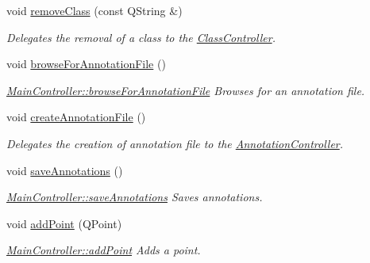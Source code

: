 \begin{DoxyCompactItemize}
void \hyperlink{classMainController_ad639a2fd588d6fe011701a5168184883}{remove\+Class} (const Q\+String \&)
\begin{DoxyCompactList}\small\item\em Delegates the removal of a class to the \hyperlink{classClassController}{Class\+Controller}. \end{DoxyCompactList}\item 
\mbox{\label{classMainController_a018730fa763bed9ef77bb7c2fc994bb8}} 
void \hyperlink{classMainController_a018730fa763bed9ef77bb7c2fc994bb8}{browse\+For\+Annotation\+File} ()
\begin{DoxyCompactList}\small\item\em \hyperlink{classMainController_a018730fa763bed9ef77bb7c2fc994bb8}{Main\+Controller\+::browse\+For\+Annotation\+File} Browses for an annotation file. \end{DoxyCompactList}\item 
\mbox{\label{classMainController_adcab0ecd57994728c1ad67dafc844179}} 
void \hyperlink{classMainController_adcab0ecd57994728c1ad67dafc844179}{create\+Annotation\+File} ()
\begin{DoxyCompactList}\small\item\em Delegates the creation of annotation file to the \hyperlink{classAnnotationController}{Annotation\+Controller}. \end{DoxyCompactList}\item 
\mbox{\label{classMainController_a6051544c31fbdeb375a88715b8406b52}} 
void \hyperlink{classMainController_a6051544c31fbdeb375a88715b8406b52}{save\+Annotations} ()
\begin{DoxyCompactList}\small\item\em \hyperlink{classMainController_a6051544c31fbdeb375a88715b8406b52}{Main\+Controller\+::save\+Annotations} Saves annotations. \end{DoxyCompactList}\item 
void \hyperlink{classMainController_a215cb23587a572993fb00b0c09a393e2}{add\+Point} (Q\+Point)
\begin{DoxyCompactList}\small\item\em \hyperlink{classMainController_a215cb23587a572993fb00b0c09a393e2}{Main\+Controller\+::add\+Point} Adds a point. \end{DoxyCompactList}\item 

\end{DoxyCompactItemize}

